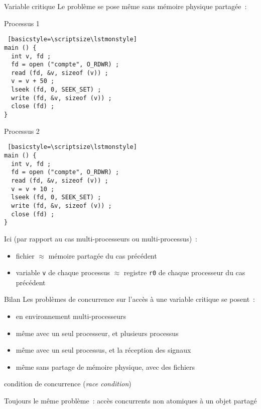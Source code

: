 \begin {frame} [fragile] {Variable critique}
    Le problème se pose même sans mémoire physique partagée~:

    \vspace* {3mm}

\begin {minipage} {.45\textwidth}
\centerline {Processus 1}
\scriptsize
\begin {lstlisting} [basicstyle=\scriptsize\lstmonstyle]
main () {
  int v, fd ;
  fd = open ("compte", O_RDWR) ;
  read (fd, &v, sizeof (v)) ;
  v = v + 50 ;
  lseek (fd, 0, SEEK_SET) ;
  write (fd, &v, sizeof (v)) ;
  close (fd) ;
}
\end{lstlisting}
\end {minipage}
\hfill
\begin {minipage} {.45\textwidth}
\centerline {Processus 2}
\begin {lstlisting} [basicstyle=\scriptsize\lstmonstyle]
main () {
  int v, fd ;
  fd = open ("compte", O_RDWR) ;
  read (fd, &v, sizeof (v)) ;
  v = v + 10 ;
  lseek (fd, 0, SEEK_SET) ;
  write (fd, &v, sizeof (v)) ;
  close (fd) ;
}
\end{lstlisting}
\end {minipage}

    Ici (par rapport au cas multi-processeurs ou multi-processus)~:
    \begin {itemize}
	\item fichier $\approx$ mémoire partagée du cas précédent
	\item variable \texttt {v} de chaque processus $\approx$
	    registre \texttt {r0} de chaque processeur du cas précédent
    \end {itemize}

\end{frame}

\begin {frame} {Bilan}
    Les problèmes de concurrence sur l'accès à une variable critique
    se posent~:

    \begin {itemize}
	\item en environnement multi-processeurs
	\item même avec un seul processeur, et plusieurs
	    processus
	\item même avec un seul processus, et la réception des signaux
	\item même sans partage de mémoire physique, avec des fichiers

    \end {itemize}

    \implique condition de concurrence (\emph {race condition})

    \vspace* {3mm}

    Toujours le même problème~: accès concurrents non atomiques à
    un objet partagé

\end {frame}

